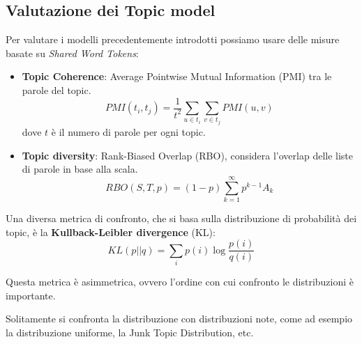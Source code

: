 \subsection{Valutazione dei Topic model}
Per valutare i modelli precedentemente introdotti possiamo usare delle misure
basate su \textit{Shared Word Tokens}:
\begin{itemize}
      \item \textbf{Topic Coherence}: Average Pointwise Mutual Information (PMI)
            tra le parole del topic.
            \begin{equation*}
                  PMI(t_i, t_j) = \frac{1}{t^2} \sum_{u \in t_i} \sum_{v \in t_j} PMI(u, v)
            \end{equation*}
            dove $t$ è il numero di parole per ogni topic.
      \item \textbf{Topic diversity}: Rank-Biased Overlap (RBO), considera l'overlap
            delle liste di parole in base alla scala.
            \begin{equation*}
                  RBO(S, T, p) = (1 - p) \sum_{k = 1}^{\infty} p^{k - 1} A_k
            \end{equation*}
\end{itemize}
Una diversa metrica di confronto, che si basa sulla distribuzione di probabilità
dei topic, è la \textbf{Kullback-Leibler divergence} (KL):
\begin{equation}
      KL(p||q) = \sum_{i} p(i) \log \frac{p(i)}{q(i)}
\end{equation}
\begin{nota}
      Questa metrica è asimmetrica, ovvero l'ordine con cui confronto le distribuzioni
      è importante.
\end{nota}
Solitamente si confronta la distribuzione con distribuzioni note, come ad esempio
la distribuzione uniforme, la Junk Topic Distribution, etc.
